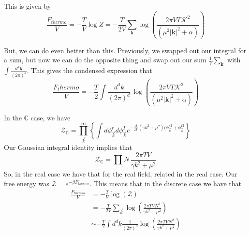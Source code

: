 This is given by
\[ 
\frac{ F_{ thermo} }{ V} =  - \frac{ T}{ V} \log Z =  - \frac{ T}{ 2V } \sum_{ \mathbf{k}} \log \left( \frac{ 2 \pi  V T \mathcal{K}^2 }{ ( \mu^2 |\mathbf{k}|^2 + \alpha ) } \right) 
\] 

But, we can do even better than this. Previously, we swapped out our integral for a sum, but now we can do the opposite thing and swap out our sum $\frac{ 1}{ V } \sum_\mathbf{k} $ with $\int \frac{ d^d \mathbf{ k} } { ( 2 \pi)^d } $. This gives the condensed expression that 
\[ 
\frac{ F_thermo}{ V} = - \frac{ T}{ 2} \int \frac{ d^d k}{ ( 2\pi )^d } \, \log \left( \frac{ 2 \pi V T \mathcal{K}^2 } { (\mu^2 |\mathbf{k}|^2 + \alpha ) } \right)  
\] 

In the $\mathbb{ C} $ case, we have 
\[
	\mathcal{ Z}_{\mathbb{ C} } = \prod_{\vec{k}}^{\infty} \left\{ \int d \phi_{\vec{k} }^r d\phi_{\vec{k} }^I e^{  - \frac{\beta}{2 V  } ( \gamma k^ 2 + \mu^ 2 )( \phi_{ \vec{k} }^ { r 2 }   + \phi_{\vec{k} }^{ I 2 }}  \right\}   
\] 
Our Gaussian integral identity implies that 
\[
	\mathcal{ Z}_{\mathbb{ C} } = \prod \mathcal{ N } \frac{ 2 \pi T V }{ \gamma k^ 2+ \mu^2 }  
\] So, in the real case we have that for the real field, 
related in the real case. 
Our free energy was $ \mathcal{ Z } = e^{  - \beta F_{ thermo  } }$. This means that 
in the discrete case 
we have that 
\begin{align*}
	\frac{F_{thermo  } }{V } &=   - \frac{T}{V} \log ( \mathcal{ Z })  \\
				 &=   - \frac{T}{ 2V } \sum_{ \vec{k} } \log \left( \frac{ 2 \pi T V N^2 }{ \gamma k^ 2 + \mu^  2} \right)  \\
				 & \sim  - \frac{T}{2 }\int d^{ d } k \frac{ 1 }{ ( 2\pi )^d } \log \left( \frac{ 2 \pi T V N^2  }{ \gamma k^2 + \mu^ 2 } \right) 
\end{align*}

